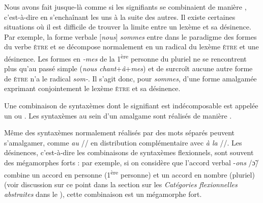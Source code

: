 Nous avons fait jusque-là comme si les signifiants se combinaient de manière , c’est-à-dire en s’enchaînant les uns à la suite des autres. Il existe certaines situations où il est difficile de trouver la limite entre un lexème et sa désinence. Par exemple, la forme verbale [\textit{nous}] \textit{sommes} entre dans le paradigme des formes du verbe \textsc{être} et se décompose normalement en un radical du lexème \textsc{être} et une désinence. Les formes en \textit{{}-mes} de la 1\textsuperscript{ère} personne du pluriel ne se rencontrent plus qu’au passé simple (\textit{nous chant}+\textit{â}+\textit{mes}) et de surcroît aucune autre forme de \textsc{être} n’a le radical \textit{som-}. Il s’agit donc, pour \textit{sommes}, d’une forme amalgamée exprimant conjointement le lexème \textsc{être} et sa désinence.

{Une combinaison de syntaxèmes dont le signifiant est indécomposable est appelée un  ou . Les syntaxèmes au sein d’un amalgame sont réalisés de manière .}

Même des syntaxèmes normalement réalisés par des mots séparés peuvent s’amalgamer, comme \textit{au} // en distribution complémentaire avec \textit{à la} //. Les désinences, c’est-à-dire les combinaisons de syntaxèmes flexionnels, sont souvent des mégamorphes forts : par exemple, si on considère que l’accord verbal -\textit{ons} /\textstylePhono\~{ɔ}/ combine un accord en personne (1\textsuperscript{ère} personne) et un accord en nombre (pluriel) (voir discussion sur ce point dans la section sur les \textit{Catégories flexionnelles abstraites} dans le ), cette combinaison est un mégamorphe fort.

